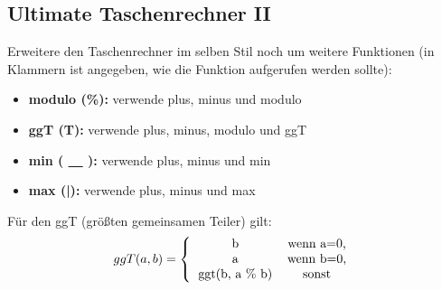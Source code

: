 \subsection{Ultimate Taschenrechner II }
Erweitere den Taschenrechner im selben Stil noch um weitere Funktionen (in Klammern ist angegeben, wie die Funktion aufgerufen werden sollte):
\begin{itemize}
    \item \textbf{\textcolor[rgb]{0,0.5,1}{modulo (\%):}} verwende plus, minus und modulo
    \item \textbf{\textcolor[rgb]{0,0.5,1}{ggT (T):}} verwende plus, minus, modulo und ggT
    \item \textbf{\textcolor[rgb]{0,0.5,1}{min ( \underline{\ \ } ):}} verwende plus, minus und min
    \item \textbf{\textcolor[rgb]{0,0.5,1}{max (|):}} verwende plus, minus und max
\end{itemize}
Für den ggT (größten gemeinsamen Teiler) gilt:
$$ggT(a,b)=\left\{\begin{tabular}{cc}b&wenn a=0,\\a&wenn b=0,\\ggt(b, a \% b)&sonst\end{tabular}\right.$$
